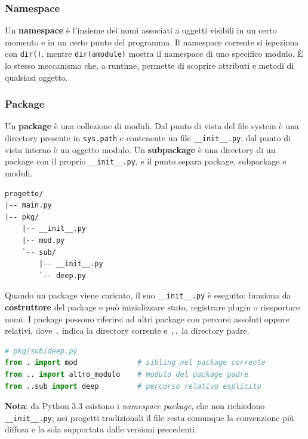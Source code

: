 \documentclass[12pt]{extarticle}
\begin{document}
\subsubsection{Namespace}

\noindent Un \textbf{namespace} è l'insieme dei nomi associati a oggetti visibili in un certo momento e in un certo punto del programma. Il namespace corrente si ispeziona con \texttt{dir()}, mentre \texttt{dir(amodule)} mostra il namespace di uno specifico modulo. È lo stesso meccanismo che, a runtime, permette di scoprire attributi e metodi di qualsiasi oggetto.

\subsubsection{Package}

\noindent Un \textbf{package} è una collezione di moduli. Dal punto di vista del file system è una directory presente in \texttt{sys.path} e contenente un file \texttt{\_\_init\_\_.py}; dal punto di vista interno è un oggetto modulo. Un \textbf{subpackage} è una directory di un package con il proprio \texttt{\_\_init\_\_.py}, e il punto separa package, subpackage e moduli.

\noindent\begin{minipage}{\linewidth}
\begin{lstlisting}[numbers=none]
progetto/
|-- main.py
|-- pkg/
    |-- __init__.py
    |-- mod.py
    `-- sub/
        |-- __init__.py
        `-- deep.py
\end{lstlisting}
\end{minipage}

\noindent Quando un package viene caricato, il suo \texttt{\_\_init\_\_.py} è eseguito: funziona da \textbf{costruttore} del package e può inizializzare stato, registrare plugin o riesportare nomi. I package possono riferirsi ad altri package con percorsi assoluti oppure relativi, dove \texttt{.} indica la directory corrente e \texttt{..} la directory padre.

\begin{lstlisting}[language=Python]
# pkg/sub/deep.py
from . import mod              # sibling nel package corrente
from .. import altro_modulo    # modulo del package padre
from ..sub import deep         # percorso relativo esplicito
\end{lstlisting}

\noindent \textbf{Nota}: da Python 3.3 esistono i \emph{namespace package}, che non richiedono \texttt{\_\_init\_\_.py}; nei progetti tradizionali il file resta comunque la convenzione più diffusa e la sola supportata dalle versioni precedenti.
\end{document}
